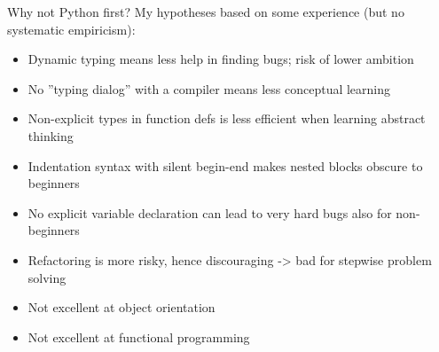 \documentclass[aspectratio=169]{beamer}
\newcommand{\EndSlide}{\begin{frame}[plain]\endpage\end{frame}}
\newenvironment{Slide}[1]%
  {\begin{frame}[environment=Slide]{#1}}
  {\end{frame}}%
\begin{document}
\EndSlide


\begin{Slide}{Why not Python first?}
  My hypotheses based on some experience (but no systematic empiricism):
\begin{itemize}
  \item Dynamic typing means less help in finding bugs; risk of lower ambition
  \item No ''typing dialog'' with a compiler means less conceptual learning
  \item Non-explicit types in function defs is less efficient when learning abstract thinking
  \item Indentation syntax with silent begin-end makes nested blocks obscure to beginners
  \item No explicit variable declaration can lead to very hard bugs also for non-beginners 
  \item Refactoring is more risky, hence discouraging -> bad for stepwise problem solving
  \item Not excellent at object orientation
  \item Not excellent at functional programming
\end{itemize}  
\end{Slide}
\end{document}
